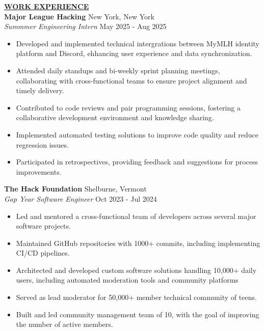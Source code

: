 \documentclass{article}
\begin{document}
\noindent \textbf{\underline{WORK EXPERIENCE}} \\
\noindent \textbf{Major League Hacking} \hfill New York, New York \\
\textit{Summmer Engineering Intern} \hfill May 2025 - Aug 2025
\begin{itemize}[noitemsep,nolistsep,leftmargin=*]
\item {Developed and implemented technical intergrations between MyMLH identity platform and Discord, ehhancing user experience and data synchronization.}
\item {Attended daily standups and bi-weekly sprint planning meetings, collaborating with cross-functional teams to ensure project alignment and timely delivery.}
\item {Contributed to code reviews and pair programming sessions, fostering a collaborative development environment and knowledge sharing.}
\item {Implemented automated testing solutions to improve code quality and reduce regression issues.}
\item {Participated in retrospectives, providing feedback and suggestions for process improvements. \\}
\end{itemize}

\noindent \textbf{The Hack Foundation} \hfill Shelburne, Vermont \\
\textit{Gap Year Software Engineer} \hfill Oct 2023 - Jul 2024
\begin{itemize}[noitemsep,nolistsep,leftmargin=*]
\item {Led and mentored a cross-functional team of developers across several major software projects.}
\item {Maintained GitHub repositories with 1000+ commits, including implementing CI/CD pipelines.}
\item {Architected and developed custom software solutions handling 10,000+ daily users, including automated moderation tools and community platforms}
\item {Served as lead moderator for 50,000+ member technical community of teens.}
\item {Built and led community management team of 10, with the goal of improving the number of active members. \\}
\end{itemize}
\end{document}
